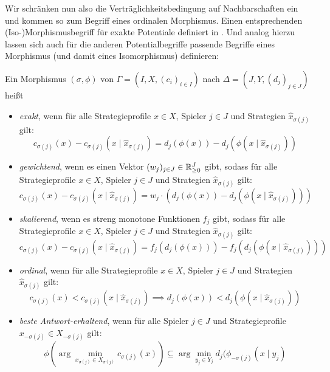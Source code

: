 
Wir schränken nun also die Verträglichkeitsbedingung auf Nachbarschaften ein und kommen so zum Begriff eines ordinalen Morphismus. Einen entsprechenden (Iso-)Morphismusbegriff für exakte Potentiale definiert \citeauthor{ReprOfFiniteGamesAsNCG} in \cite{ReprOfFiniteGamesAsNCG}. Und analog hierzu lassen sich auch für die anderen Potentialbegriffe passende Begriffe eines Morphismus (und damit eines Isomorphismus) definieren:

\begin{defn}\label{def:PotentialMorphismen}
	Ein Morphismus $(\sigma, \phi)$ von $\Gamma = (I, X, (c_i)_{i\in I})$ nach $\Delta = (J, Y, (d_j)_{j\in J})$ heißt
	\begin{itemize}
		\item \emph{exakt}, wenn für alle Strategieprofile $x \in X$, Spieler $j \in J$ und Strategien $\hat{x}_{\sigma(j)}$ gilt:
		\[c_{\sigma(j)}(x) - c_{\sigma(j)}(x \mid \hat{x}_{\sigma(j)}) = d_j(\phi(x)) - d_j(\phi(x \mid \hat{x}_{\sigma(j)}))\]
		\item \emph{gewichtend}, wenn es einen Vektor $(w_j)_{j \in J} \in \mathbb{R}_{\geq 0}^J$ gibt, sodass für alle Strategieprofile $x \in X$, Spieler $j \in J$ und Strategien $\hat{x}_{\sigma(j)}$ gilt:
		\[c_{\sigma(j)}(x) - c_{\sigma(j)}(x \mid \hat{x}_{\sigma(j)}) = w_j\cdot\left(d_j(\phi(x)) - d_j(\phi(x \mid \hat{x}_{\sigma(j)}))\right)\]
		\item \emph{skalierend}, wenn es streng monotone Funktionen $f_j$ gibt, sodass für alle Strategieprofile $x \in X$, Spieler $j \in J$ und Strategien $\hat{x}_{\sigma(j)}$ gilt:
		\[c_{\sigma(j)}(x) - c_{\sigma(j)}(x \mid \hat{x}_{\sigma(j)}) = f_j(d_j(\phi(x))) - f_j(d_j(\phi(x \mid \hat{x}_{\sigma(j)})))\]
		\item \emph{ordinal}, wenn für alle Strategieprofile $x \in X$, Spieler $j \in J$ und Strategien $\hat{x}_{\sigma(j)}$ gilt:
		\[c_{\sigma(j)}(x) < c_{\sigma(j)}(x \mid \hat{x}_{\sigma(j)}) \implies d_j(\phi(x)) < d_j(\phi(x \mid \hat{x}_{\sigma(j)}))\]
		\item \emph{beste Antwort-erhaltend}, wenn für alle Spieler $j \in J$ und Strategieprofile $x_{-\sigma(j)} \in X_{-\sigma(j)}$ gilt:
		\[\phi(\arg \min_{x_{\sigma(j)} \in X_{\sigma(j)}}c_{\sigma(j)}(x)) \subseteq \arg \min_{y_j \in Y_j} d_j(\phi_{-\sigma(j)}(x \mid y_j)\]
	\end{itemize}	
\end{defn}

